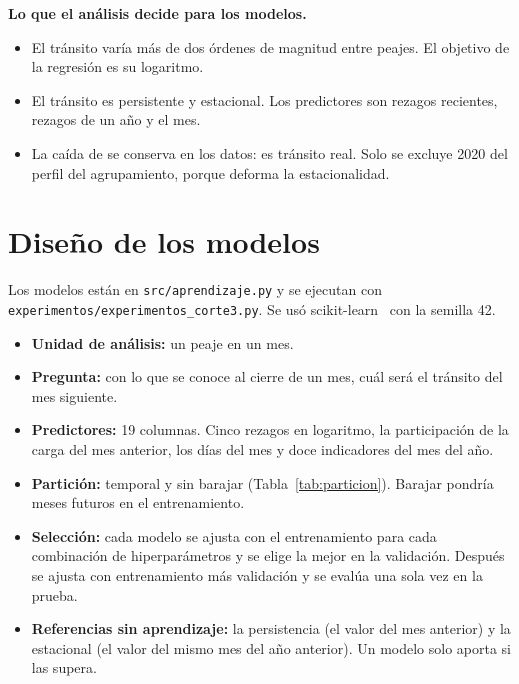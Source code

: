 \documentclass[12pt,a4paper]{article}
\begin{document}
\textbf{Lo que el análisis decide para los modelos.}
\begin{itemize}
\item El tránsito varía más de dos órdenes de magnitud entre peajes. El
objetivo de la regresión es su logaritmo.
\item El tránsito es persistente y estacional. Los predictores son rezagos
recientes, rezagos de un año y el mes.
\item La caída de \ctMesMinimo{} se conserva en los datos: es tránsito real.
Solo se excluye 2020 del perfil del agrupamiento, porque deforma la
estacionalidad.
\end{itemize}

\section{Diseño de los modelos}
\label{sec:diseno}

Los modelos están en \texttt{src/aprendizaje.py} y se ejecutan con
\texttt{experimentos/experimentos\_corte3.py}. Se usó
scikit-learn~\cite{sklearn} con la semilla 42.

\begin{itemize}
\item \textbf{Unidad de análisis:} un peaje en un mes.
\item \textbf{Pregunta:} con lo que se conoce al cierre de un mes, cuál será
el tránsito del mes siguiente.
\item \textbf{Predictores:} 19 columnas. Cinco rezagos en logaritmo, la
participación de la carga del mes anterior, los días del mes y doce
indicadores del mes del año.
\item \textbf{Partición:} temporal y sin barajar (Tabla~\ref{tab:particion}).
Barajar pondría meses futuros en el entrenamiento.
\item \textbf{Selección:} cada modelo se ajusta con el entrenamiento para
cada combinación de hiperparámetros y se elige la mejor en la validación.
Después se ajusta con entrenamiento más validación y se evalúa una sola vez
en la prueba.
\item \textbf{Referencias sin aprendizaje:} la persistencia (el valor del mes
anterior) y la estacional (el valor del mismo mes del año anterior). Un
modelo solo aporta si las supera.
\end{itemize}

\begin{table}[H]
\centering
\caption{Partición temporal de las filas modelables}
\label{tab:particion}
\small

\end{table}
\end{document}
